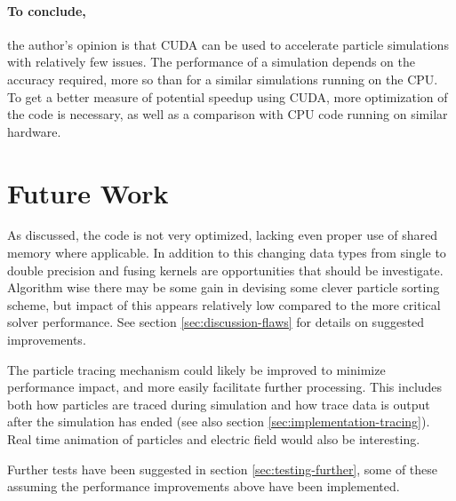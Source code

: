 \paragraph{To conclude,} the author's opinion is that CUDA can be used to accelerate particle simulations with relatively few issues.
The performance of a simulation depends on the accuracy required, more so than for a similar simulations running on the
CPU. To get a better measure of potential speedup using CUDA, more optimization of the code is necessary, as well as a
comparison with CPU code running on similar hardware.

\section{Future Work}
As discussed, the code is not very optimized, lacking even proper use of shared memory where applicable. In addition to
this changing data types from single to double precision and fusing kernels are opportunities that should be investigate.
Algorithm wise there may be some gain in devising some clever particle sorting scheme, but impact of this appears
relatively low compared to the more critical solver performance. See section \ref{sec:discussion-flaws} for details on
suggested improvements.

The particle tracing mechanism could likely be improved to minimize performance impact, and more easily facilitate
further processing. This includes both how particles are traced during simulation and how trace data is output after
the simulation has ended (see also section \ref{sec:implementation-tracing}). Real time animation of particles and
electric field would also be interesting.

Further tests have been suggested in section \ref{sec:testing-further}, some of these assuming the performance
improvements above have been implemented.